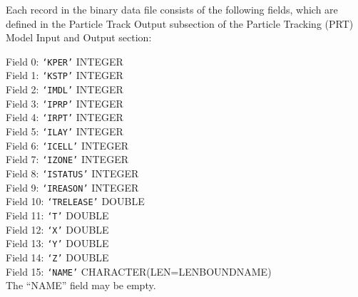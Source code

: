 Each record in the binary data file consists of the following fields, which are defined in the
Particle Track Output subsection of the Particle Tracking (PRT) Model Input and Output section:

\vspace{5mm}
\noindent Field 0: \texttt{`KPER'} {\color{red} \footnotesize{INTEGER}} \\
\noindent Field 1: \texttt{`KSTP'} {\color{red} \footnotesize{INTEGER}} \\
\noindent Field 2: \texttt{`IMDL'} {\color{red} \footnotesize{INTEGER}} \\
\noindent Field 3: \texttt{`IPRP'} {\color{red} \footnotesize{INTEGER}} \\
\noindent Field 4: \texttt{`IRPT'} {\color{red} \footnotesize{INTEGER}} \\
\noindent Field 5: \texttt{`ILAY'} {\color{red} \footnotesize{INTEGER}} \\
\noindent Field 6: \texttt{`ICELL'} {\color{red} \footnotesize{INTEGER}} \\
\noindent Field 7: \texttt{`IZONE'} {\color{red} \footnotesize{INTEGER}} \\
\noindent Field 8: \texttt{`ISTATUS'} {\color{red} \footnotesize{INTEGER}} \\
\noindent Field 9: \texttt{`IREASON'} {\color{red} \footnotesize{INTEGER}} \\
\noindent Field 10: \texttt{`TRELEASE'} {\color{red} \footnotesize{DOUBLE}} \\
\noindent Field 11: \texttt{`T'} {\color{red} \footnotesize{DOUBLE}} \\
\noindent Field 12: \texttt{`X'} {\color{red} \footnotesize{DOUBLE}} \\
\noindent Field 13: \texttt{`Y'} {\color{red} \footnotesize{DOUBLE}} \\
\noindent Field 14: \texttt{`Z'} {\color{red} \footnotesize{DOUBLE}} \\
\noindent Field 15: \texttt{`NAME'} {\color{red} \footnotesize{CHARACTER(LEN=LENBOUNDNAME)}} \\

\vspace{4mm}
\noindent The ``NAME'' field may be empty.
